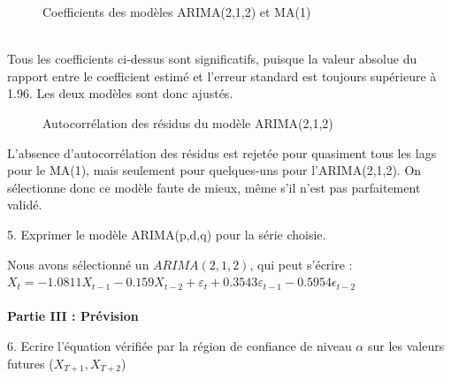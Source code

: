 \documentclass[a4paper, 12pt]{article} %
\begin{document}
\begin{figure}[h]
    \centering
    \caption{Coefficients des modèles ARIMA(2,1,2) et MA(1)}
\end{figure}
\normalsize{
{\\Tous les coefficients ci-dessus sont significatifs, puisque la valeur absolue du rapport entre le coefficient estimé et l'erreur standard est toujours supérieure à 1.96. Les deux modèles sont donc ajustés.
}}
\begin{figure}[h]
    \centering
    \caption{Autocorrélation des résidus du modèle ARIMA(2,1,2)}
\end{figure}
\normalsize{
{L'absence d'autocorrélation des résidus est rejetée pour quasiment tous les lags pour le MA(1), mais seulement pour quelques-uns pour l'ARIMA(2,1,2). On sélectionne donc ce modèle faute de mieux, même s'il n'est pas parfaitement validé.
}}
\begin{tcolorbox}
{\small
5. Exprimer le modèle ARIMA(p,d,q) pour la série choisie.}
\end{tcolorbox}
\normalsize
{Nous avons sélectionné un $ARIMA(2, 1, 2)$, qui peut s'écrire :$X_t = -1.0811 X_{t-1} - 0.159 X_{t-2} + \varepsilon_t + 0.3543 \varepsilon_{t-1} - 0.5954\epsilon_{t-2}$
}\\ \\
\Large{\textbf{Partie III : Prévision}}
\begin{tcolorbox}
{\small
6. Ecrire l’équation vérifiée par la région de confiance de niveau \textbf{$\alpha$} sur les valeurs futures ($X_{T+1}, X_{T+2}$)}
\end{tcolorbox}
\normalsize
\end{document}
